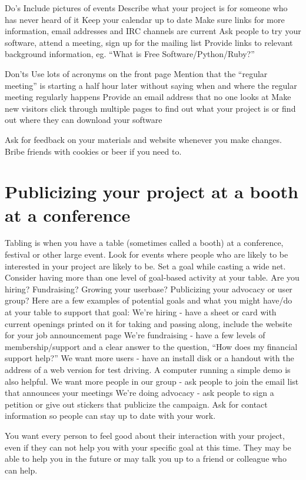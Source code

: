 Do’s
Include pictures of events
Describe what your project is for someone who has never heard of it
Keep your calendar up to date
Make sure links for more information, email addresses and IRC channels are current
Ask people to try your software, attend a meeting, sign up for the mailing list
Provide links to relevant background information, eg. “What is Free Software/Python/Ruby?” 

Don’ts
Use lots of acronyms on the front page
Mention that the “regular meeting” is starting a half hour later without saying when and where the regular meeting regularly happens
Provide an email address that no one looks at
Make new visitors click through multiple pages to find out what your project is or find out where they can download your software

Ask for feedback on your materials and website whenever you make changes. Bribe friends with cookies or beer if you need to.

\section{Publicizing your project at a booth at a conference}

Tabling is when you have a table (sometimes called a booth) at a conference, festival or other large event. Look for events where people who are likely to be interested in your project are likely to be. Set a goal while casting a wide net. Consider having more than one level of goal-based activity at your table. Are you hiring? Fundraising? Growing your userbase? Publicizing your advocacy or user group?  Here are a few examples of potential goals and what you might have/do at your table to support that goal:
We’re hiring - have a sheet or card with current openings printed on it for taking and passing along, include the website for your job announcement page
We’re fundraising - have a few levels of membership/support and a clear answer to the question, “How does my financial support help?”
We want more users - have an install disk or a handout with the address of a web version for test driving. A computer running a simple demo is also helpful. 
We want more people in our group - ask people to join the email list that announces your meetings
We’re doing advocacy - ask people to sign a petition or give out stickers that publicize the campaign. Ask for contact information so people can stay up to date with your work.  

You want every person to feel good about their interaction with your project, even if they can not help you with your specific goal at this time. They may be able to help you in the future or may talk you up to a friend or colleague who can help. 

